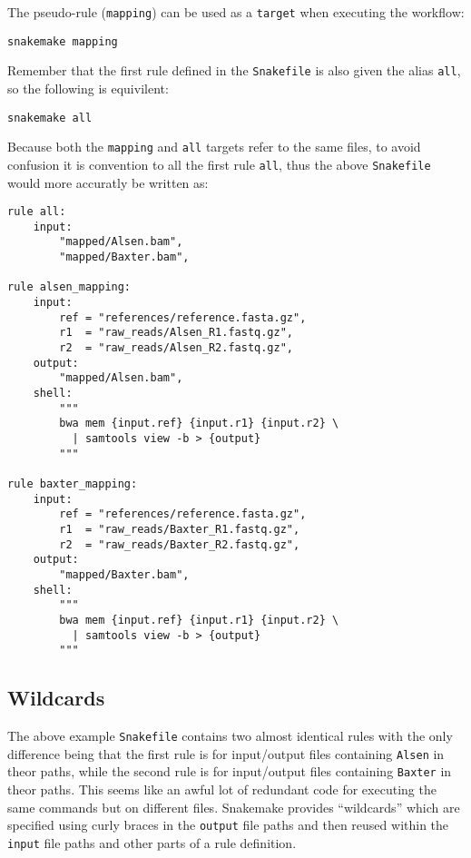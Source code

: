 The pseudo-rule (\texttt{mapping}) can be used as a \texttt{target} when executing the workflow:

\begin{lstlisting}
snakemake mapping
\end{lstlisting}

Remember that the first rule defined in the \texttt{Snakefile} is also given the alias \texttt{all}, so the following is equivilent:

\begin{lstlisting}
snakemake all
\end{lstlisting}

Because both the \texttt{mapping} and \texttt{all} targets refer to the same files, to avoid confusion it is convention to all the
first rule \texttt{all}, thus the above \texttt{Snakefile} would more accuratly be written as:

\begin{lstlisting}
rule all:
	input:
		"mapped/Alsen.bam",
		"mapped/Baxter.bam",

rule alsen_mapping:
	input:
		ref = "references/reference.fasta.gz",
		r1  = "raw_reads/Alsen_R1.fastq.gz",
		r2  = "raw_reads/Alsen_R2.fastq.gz",
	output:
		"mapped/Alsen.bam",
	shell:
		"""
		bwa mem {input.ref} {input.r1} {input.r2} \
		  | samtools view -b > {output}
		"""

rule baxter_mapping:
	input:
		ref = "references/reference.fasta.gz",
		r1  = "raw_reads/Baxter_R1.fastq.gz",
		r2  = "raw_reads/Baxter_R2.fastq.gz",
	output:
		"mapped/Baxter.bam",
	shell:
		"""
		bwa mem {input.ref} {input.r1} {input.r2} \
		  | samtools view -b > {output}
		"""
\end{lstlisting}


\subsection{Wildcards}

The above example \texttt{Snakefile} contains two almost identical rules with the only difference being that the first rule is for input/output
files containing \texttt{Alsen} in theor paths, while the second rule is for input/output files containing \texttt{Baxter} in theor paths. This
seems like an awful lot of redundant code for executing the same commands but on different files. Snakemake provides ``wildcards'' which are
specified using curly braces in the \texttt{output} file paths and then reused within the \texttt{input} file paths and other parts of a rule
definition.

